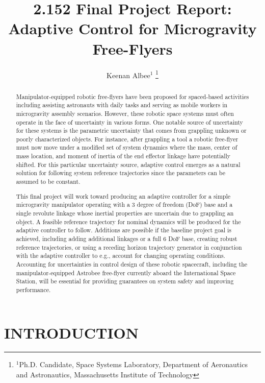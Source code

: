 \documentclass[letterpaper, 10 pt, conference]{ieeeconf}  %
\title{\LARGE \bf
2.152 Final Project Report: Adaptive Control for Microgravity Free-Flyers
}
\author{Keenan Albee$^1$%
\thanks{$^{1}$Ph.D. Candidate, Space Systems Laboratory, Department of Aeronautics and Astronautics, Massachusetts Institute of Technology}%
}
\begin{document}
\maketitle
\thispagestyle{empty}
\pagestyle{empty}


\begin{abstract}
Manipulator-equipped robotic free-flyers have been proposed for spaced-based activities including assisting astronauts with daily tasks and serving as mobile workers in microgravity assembly scenarios. However, these robotic space systems must often operate in the face of uncertainty in various forms. One notable source of uncertainty for these systems is the parametric uncertainty that comes from grappling unknown or poorly characterized objects. For instance, after grappling a tool a robotic free-flyer must now move under a modified set of system dynamics where the mass, center of mass location, and moment of inertia of the end effector linkage have potentially shifted. For this particular uncertainty source, adaptive control emerges as a natural solution for following system reference trajectories since the parameters can be assumed to be constant.

This final project will work toward producing an adaptive controller for a simple microgravity manipulator operating with a 3 degree of freedom (DoF) base and a single revolute linkage whose inertial properties are uncertain due to grappling an object. A feasible reference trajectory for nominal dynamics will be produced for the adaptive controller to follow. Additions are possible if the baseline project goal is achieved, including adding additional linkages or a full 6 DoF base, creating robust reference trajectories, or using a receding horizon trajectory generator in conjunction with the adaptive controller to e.g., account for changing operating conditions. Accounting for uncertainties in control design of these robotic spacecraft, including the manipulator-equipped Astrobee free-flyer currently aboard the International Space Station, will be essential for providing guarantees on system safety and improving performance.
\end{abstract}


\section{INTRODUCTION}
 
\end{document}
